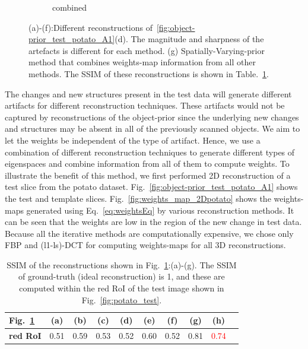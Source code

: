 \documentclass[journal]{IEEEtran}
\begin{document}
\begin{figure}[!h]
\begin{subfigure}[b]{0.24\linewidth}
        \caption{combined}
     \end{subfigure}
      \caption{(a)-(f):Different reconstructions of~\ref{fig:object-prior_test_potato_A1}(d). The magnitude and sharpness of the artefacts is different for each method. (g) Spatially-Varying-prior method that combines weights-map information from all other methods. The SSIM of these reconstructions is shown in Table.~\ref{table:potato_2D_ssim}.} 
\label{fig:reconstructions_diff_methods}
\end{figure}

The changes and new structures present in the test data will generate
different artifacts for different reconstruction techniques. These
artifacts would not be captured by reconstructions of the object-prior
since the underlying new changes and structures may be absent in all
of the previously scanned objects. We aim to let the weights be
independent of the type of artifact. Hence, we use a combination of
different reconstruction techniques to generate different types of
eigenspaces and combine information from all of them to compute
weights. To illustrate the benefit of this method, we first performed
2D reconstruction of a test slice from the potato dataset.
Fig.~\ref{fig:object-prior_test_potato_A1} shows the test and template
slices. Fig.~\ref{fig:weights_map_2Dpotato} shows the weights-maps
generated using Eq.~\ref{eq:weightsEq} by various reconstruction
methods. It can be seen that the weights are low in the region of the
new change in test data. Because all the iterative methods are
computationally expensive, we chose only FBP and (l1-ls)-DCT for
computing weights-maps for all 3D reconstructions.
\begin{table}[!h]
  \centering
\caption{SSIM of the reconstructions shown in Fig.~\ref{fig:reconstructions_diff_methods}:(a)-(g). The SSIM of ground-truth (ideal reconstruction) is 1, and these are computed within the red RoI of the test image shown in Fig.~\ref{fig:potato_test}.}
\begin{tabular}{|l|c|c|c|c|c|c|c|c|c|}
\hline
 Fig.~\ref{fig:reconstructions_diff_methods}  & \textbf{(a)} & \textbf{(b)} & \textbf{(c)} & \textbf{(d)} & \textbf{(e)} & \textbf{(f)} &  \textbf{(g)} &  \textbf{(h)} \\\hline
\textbf{red RoI}  & 0.51 & 0.59  & 0.53 & 0.52 & 0.60 & 0.52 & 0.81 &\textcolor{red}{0.74} \\ \hline
\end{tabular}
\label{table:potato_2D_ssim}
\end{table}
\end{document}
